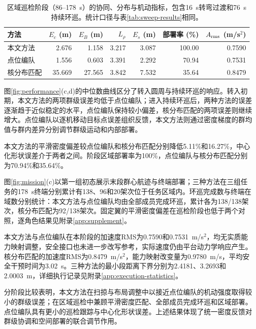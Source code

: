 \documentclass[UTF8,a4paper,11pt,fontset=none]{ctexart}
\begin{document}
\begin{table}[htbp]\centering\small
\caption{区域巡检阶段（86--178~s）的协同、分布与机动指标，包含16~s转弯过渡和76~s持续环巡。统计口径与表\ref{tab:sweep-results}相同。}\label{tab:patrol-results}
\setlength{\tabcolsep}{4pt}
\begin{tabular}{lrrrrrr}\toprule
方法 & $E_c$ (m) & $E_B$ (m) & $L_\rho$ & $E_s$ (m) & 部署率 (\%) & $A_{\rm rms}$ (m/s$^2$)\\\midrule
本文方法 & 2.676 & 1.158 & 3.217 & 3.087 & 100.00 & 0.7590\\
点位编队 & 1.556 & 0.603 & 3.391 & 2.292 & 70.94 & 0.7531\\
核分布匹配 & 35.669 & 27.565 & 3.842 & 7.532 & 35.64 & 0.8479\\\bottomrule
\end{tabular}\end{table}

图\ref{fig:performance}(c,d)的中位数曲线区分了转入圆周与持续环巡的响应。转入初期，本文方法的两项群级误差均低于点位编队；进入持续环巡后，两种方法的误差逐渐趋于近似稳定的水平，点位编队保持较小偏差，核分布匹配的两项误差则继续增大。点位编队以逐机移动目标点误差组织反馈，本文方法则通过密度梯度的群均值与群内差异分别调节群级运动和内部部署。

本文方法的平滑密度偏差较点位编队和核分布匹配分别降低5.11\%和16.27\%，中心化形状误差介于两者之间。阶段区域部署率为100\%，点位编队与核分布匹配分别为70.94\%和35.64\%。

\begin{samepage}
图\ref{fig:mission}(c)以第一组初态展示末段群心航迹与终端部署；三种方法在三组任务的178~s终端分别累计有138、96和20架次位于任务区域内。环巡完成数与终端在域数分别统计：本文方法与点位编队均由全部成员完成环巡，累计各为138/138架次，核分布匹配为92/138架次。固定翼的平滑密度偏差在巡检阶段也低于两个对照，逐角色结果见附录\ref{app:supplement}。
\end{samepage}

本文方法与点位编队在本阶段的加速度RMS为0.7590和0.7531~m/s$^2$，均无实质能力映射调整，安全接口也未进一步改写参考，实际速度仍由平台动力学响应产生。核分布匹配的加速度RMS为0.8479~m/s$^2$，能力映射改变量为0.9780~m/s，平均安全干预时间为3.02~s。三种方法的最小段距离下界分别为2.4181、3.2693和2.0003~m，详细执行记录见附录\ref{app:execution-statistics}。
\FloatBarrier

分阶段比较表明，本文方法在扫掠与布局调整中以接近点位编队的机动强度取得较小的群级误差；在区域巡检中兼顾平滑密度匹配、全部成员完成环巡和区域部署。点位编队具有更小的巡检跟踪与中心化形状误差。上述结果体现了统一密度反馈对群级协调和空间部署的联合调节作用。
\end{document}
